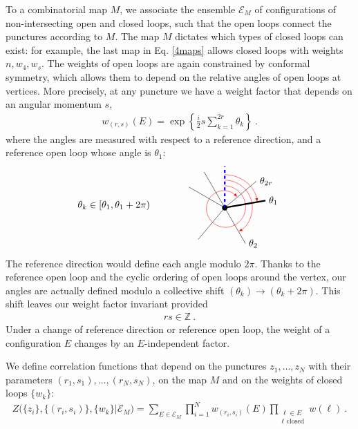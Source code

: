 \documentclass[12pt, a4paper]{article}
\theoremstyle{break}
\begin{document}
To a combinatorial map $M$, we associate the ensemble $\mathcal{E}_M$ of configurations of non-intersecting open and closed loops, such that the open loops connect the punctures according to $M$. The map $M$ dictates which types of closed loops can exist: for example, the last map in Eq. \eqref{4maps} allows closed loops with weights $n,w_4,w_s$. The weights of open loops are again constrained by conformal symmetry, which allows them to depend on the relative angles of open loops at vertices. More precisely, at any puncture we have a weight factor that depends on an angular momentum $s$,
\begin{align}
 \boxed{w_{(r,s)}(E) = \exp \left\{\tfrac{i}{2} s\textstyle{\sum}_{k=1}^{2r}\theta_{k}\right\}}\ .
 \label{wrs}
\end{align}
where the angles are measured with respect to a reference direction, and a reference open loop whose angle is $\theta_1$:
\begin{align}
 \theta_{k}\in [\theta_{1}, \theta_{1}+2\pi)
\qquad \qquad 
 \begin{tikzpicture}[baseline=(base), scale = .5]
  \coordinate (base) at (0, 0);
  \draw [domain=0:410,variable=\t,smooth,samples=35,red,-latex]
        plot ({90-\t}: {1.6- \t/1000});
  \draw[-latex, red] (0, 2.4) arc (90:10:2.4);
  \draw[-latex, red] (0, 2) arc (90:-60:2);
  \draw (0, 0) node[fill, circle, minimum size = 2mm, inner sep = 0]{};
  \foreach\t in {10, 40, 120, 150, 230, 300}{
  \draw (0, 0) -- ++(\t:3);
  }
  \draw[ultra thick, blue, dashed] (0, 0) -- ++(90:3);
  \draw[ultra thick] (0, 0) -- ++(10:3);
  \node[right] at ++(10:3) {$\theta_{1}$};
  \node[right] at ++(300:3) {$\theta_{2}$};
  \node[right] at ++(40:3) {$\theta_{2r}$};
 \end{tikzpicture}
 \label{titt}
\end{align}
The reference direction would define each angle modulo $2\pi$. Thanks to the reference open loop and the cyclic ordering of open loops around the vertex, our angles are actually defined modulo a collective shift $(\theta_k) \to (\theta_k+2\pi)$. This shift leaves our weight factor invariant provided 
\begin{align}
 rs\in \mathbb{Z}\ . 
\end{align}
Under a change of reference direction or reference open loop, the weight of a configuration $E$ changes by an $E$-independent factor.

We define correlation functions that depend on the punctures $z_1,\dots,z_N$ with their parameters $(r_1,s_1),\dots, (r_N,s_N)$, on the map $M$ and on the weights of closed loops $\{w_k\}$:
\begin{align}
 Z\Big(\{z_i\},\{(r_i,s_i)\},\{w_k\}\Big|\mathcal{E}_M\Big) =\sum_{E\in\mathcal{E}_M} \prod_{i=1}^N w_{(r_i,s_i)}(E) \prod_{\substack{\ell\in E\\ \ell \text{ closed}}} w(\ell) \ .
 \label{zbig}
\end{align}
\end{document}
